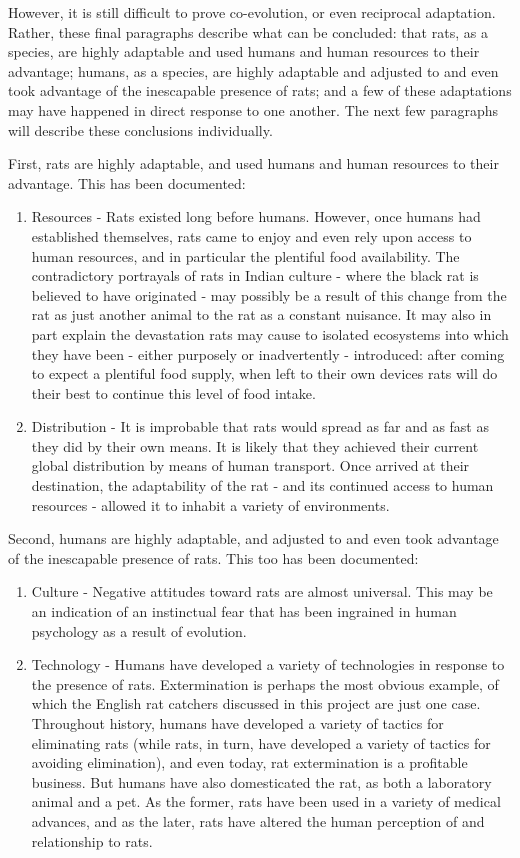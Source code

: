 \documentclass[12pt]{article}
\begin{document}
However, it is still difficult to prove co-evolution, or even reciprocal adaptation. Rather, these final paragraphs describe what can be concluded: that rats, as a species, are highly adaptable and used humans and human resources to their advantage; humans, as a species, are highly adaptable and adjusted to and even took advantage of the inescapable presence of rats; and a few of these adaptations may have happened in direct response to one another. The next few paragraphs will describe these conclusions individually.

First, rats are highly adaptable, and used humans and human resources to their advantage. This has been documented:
\begin{enumerate}
\item Resources - Rats existed long before humans. However, once humans had established themselves, rats came to enjoy and even rely upon access to human resources, and in particular the plentiful food availability. The contradictory portrayals of rats in Indian culture - where the black rat is believed to have originated - may possibly be a result of this change from the rat as just another animal to the rat as a constant nuisance. It may also in part explain the devastation rats may cause to isolated ecosystems into which they have been - either purposely or inadvertently - introduced: after coming to expect a plentiful food supply, when left to their own devices rats will do their best to continue this level of food intake.
\item Distribution - It is improbable that rats would spread as far and as fast as they did by their own means. It is likely that they achieved their current global distribution by means of human transport. Once arrived at their destination, the adaptability of the rat - and its continued access to human resources - allowed it to inhabit a variety of environments.
\end{enumerate}

Second, humans are highly adaptable, and adjusted to and even took advantage of the inescapable presence of rats. This too has been documented:
\begin{enumerate}
\item Culture - Negative attitudes toward rats are almost universal. This may be an indication of an instinctual fear that has been ingrained in human psychology as a result of evolution.
\item Technology - Humans have developed a variety of technologies in response to the presence of rats. Extermination is perhaps the most obvious example, of which the English rat catchers discussed in this project are just one case. Throughout history, humans have developed a variety of tactics for eliminating rats (while rats, in turn, have developed a variety of tactics for avoiding elimination), and even today, rat extermination is a profitable business. But humans have also domesticated the rat, as both a laboratory animal and a pet. As the former, rats have been used in a variety of medical advances, and as the later, rats have altered the human perception of and relationship to rats.
\end{enumerate}
\end{document}
